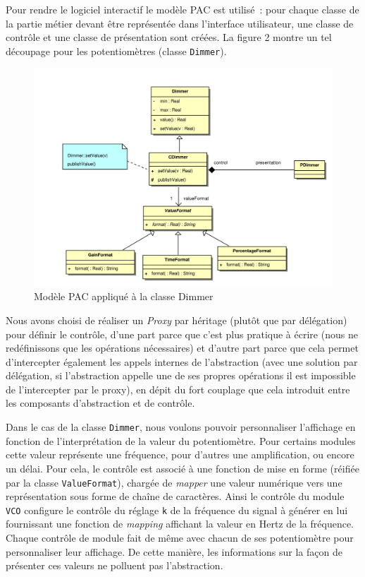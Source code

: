 Pour rendre le logiciel interactif le modèle PAC est utilisé~: pour
chaque classe de la partie métier devant être représentée dans
l'interface utilisateur, une classe de contrôle et une classe de
présentation sont créées. La figure 2 montre un tel découpage pour
les potentiomètres (classe \verb!Dimmer!).

\begin{figure}[htb]
\centering
\includegraphics[width=17cm]{../img/ps/pacdimmer-pim.pdf}
\caption{Modèle PAC appliqué à la classe Dimmer}
\end{figure}

Nous avons choisi de réaliser un \emph{Proxy} par héritage (plutôt
que par délégation) pour définir le contrôle, d'une part parce que
c'est plus pratique à écrire (nous ne redéfinissons que les
opérations nécessaires) et d'autre part parce que cela permet
d'intercepter également les appels internes de l'abstraction (avec
une solution par délégation, si l'abstraction appelle une de ses
propres opérations il est impossible de l'intercepter par le
proxy), en dépit du fort couplage que cela introduit entre les
composants d'abstraction et de contrôle.

Dans le cas de la classe \verb!Dimmer!, nous voulons pouvoir
personnaliser l'affichage en fonction de l'interprétation de la
valeur du potentiomètre. Pour certains modules cette valeur
représente une fréquence, pour d'autres une amplification, ou
encore un délai. Pour cela, le contrôle est associé à une fonction
de mise en forme (réifiée par la classe \verb!ValueFormat!),
chargée de \emph{mapper} une valeur numérique vers une
représentation sous forme de chaîne de caractères. Ainsi le
contrôle du module \verb!VCO! configure le contrôle du réglage
\verb!k! de la fréquence du signal à générer en lui fournissant une
fonction de \emph{mapping} affichant la valeur en Hertz de la
fréquence. Chaque contrôle de module fait de même avec chacun de
ses potentiomètre pour personnaliser leur affichage. De cette
manière, les informations sur la façon de présenter ces valeurs ne
polluent pas l'abstraction.

